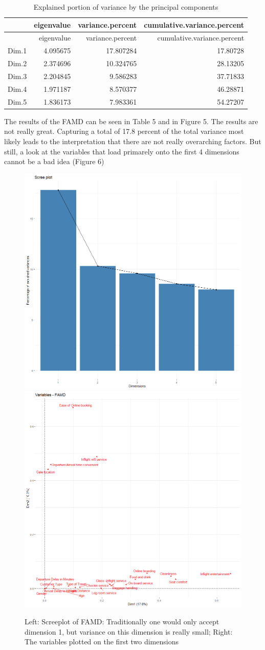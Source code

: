 \documentclass[
]{article}
\begin{document}
\begin{longtable}[]{@{}lrrr@{}}
\caption{Explained portion of variance by the principal
components}\tabularnewline
\toprule
& eigenvalue & variance.percent &
cumulative.variance.percent\tabularnewline
\midrule
\endfirsthead
\toprule
& eigenvalue & variance.percent &
cumulative.variance.percent\tabularnewline
\midrule
\endhead
Dim.1 & 4.095675 & 17.807284 & 17.80728\tabularnewline
Dim.2 & 2.374696 & 10.324765 & 28.13205\tabularnewline
Dim.3 & 2.204845 & 9.586283 & 37.71833\tabularnewline
Dim.4 & 1.971187 & 8.570377 & 46.28871\tabularnewline
Dim.5 & 1.836173 & 7.983361 & 54.27207\tabularnewline
\bottomrule
\end{longtable}

The results of the FAMD can be seen in Table 5 and in Figure 5. The
results are not really great. Capturing a total of 17.8 percent of the
total variance most likely leads to the interpretation that there are
not really overarching factors. But still, a look at the variables that
load primarely onto the first 4 dimensions cannot be a bad idea (Figure
6)

\begin{figure}
  \includegraphics[width=.48\textwidth]{..//plots//screeplot.png}
  \includegraphics[width=.48\textwidth]{..//plots//fact1.png}
  \caption{Left: Screeplot of FAMD: Traditionally one would only accept dimension 1, but variance on this dimension is really small; Right: The variables plotted on the first two dimensions}\label{fig:foobar}
\end{figure}
\end{document}
